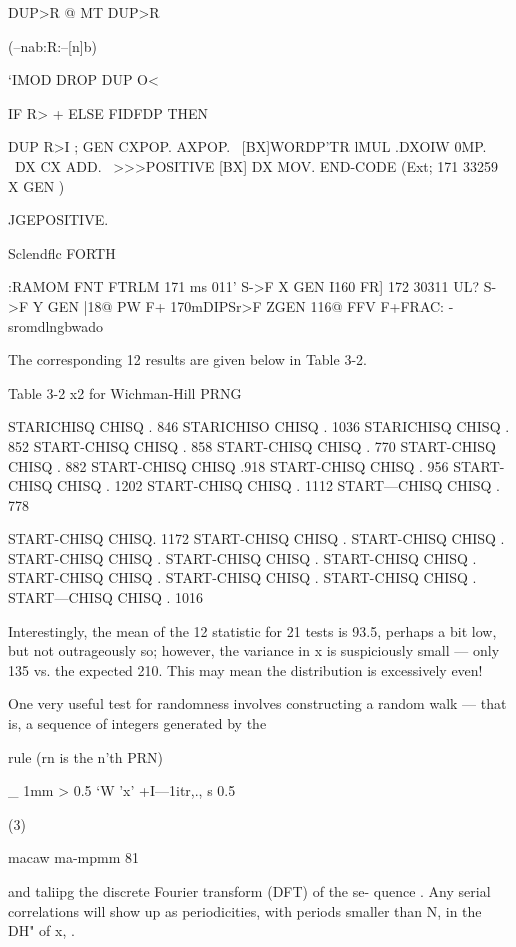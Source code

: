 DUP>R @ MT DUP>R

(--nab:R:--[n]b)

‘IMOD DROP DUP O<

IF R> + ELSE FIDFDP THEN

DUP R>I ;
\CODE GEN CXPOP. AXPOP.
\ [BX]WORDP’TR lMUL
\CXIDN.DXOIW 0MP.
\ DX CX ADD.
\ >>>POSITIVE [BX] DX MOV. END-CODE
(Ext; 171 33259 X GEN )

JGEPOSITIVE.

 

Sclendﬂc FORTH

:RAMOM FNT FTRLM
171 ms 011’ S->F X GEN I160 FR]
172 30311 UL? S->F Y GEN |18@ PW
F+
170mDIPSr>F ZGEN 116@ FFV
F+FRAC:
\mmmwmwdaw
\FTRUNCqsecIf-sromdlngbwado

The corresponding 12 results are given below in Table 3-2.

Table 3-2 x2 for Wichman-Hill PRNG

 

STARICHISQ CHISQ . 846
STARICHISO CHISQ . 1036
STARICHISQ CHISQ . 852
START-CHISQ CHISQ . 858
START-CHISQ CHISQ . 770
START-CHISQ CHISQ . 882
START-CHISQ CHISQ .918
START-CHISQ CHISQ . 956
START-CHISQ CHISQ . 1202
START-CHISQ CHISQ . 1112
START—CHISQ CHISQ . 778

 

START-CHISQ CHISQ. 1172
START-CHISQ CHISQ .
START-CHISQ CHISQ .
START-CHISQ CHISQ .
START-CHISQ CHISQ .
START-CHISQ CHISQ .
START-CHISQ CHISQ .
START-CHISQ CHISQ .
START-CHISQ CHISQ .
START—CHISQ CHISQ . 1016

 

 

Interestingly, the mean of the 12 statistic for 21 tests is 93.5,
perhaps a bit low, but not outrageously so; however, the variance
in x is suspiciously small — only 135 vs. the expected 210. This
may mean the distribution is excessively even!

One very useful test for randomness involves constructing a
random walk — that is, a sequence of integers generated by the

rule (rn is the n'th PRN)

_ 1mm > 0.5
‘W 'x' +I—1itr,., s 0.5

(3)

 

macaw ma-mpmm 81

and taliipg the discrete Fourier transform (DFT) of the se-
quence . Any serial correlations will show up as periodicities,
with periods smaller than N, in the DH" of x, .


